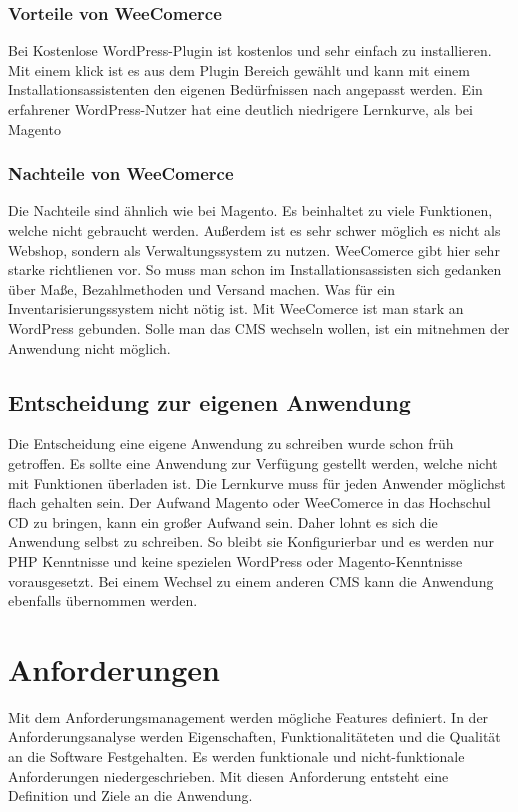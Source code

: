 \subsubsection{Vorteile von WeeComerce}
Bei Kostenlose WordPress-Plugin ist kostenlos und sehr einfach zu installieren. Mit einem klick ist es aus dem Plugin Bereich gewählt und kann mit einem Installationsassistenten den eigenen Bedürfnissen nach angepasst werden. Ein erfahrener WordPress-Nutzer hat eine deutlich niedrigere Lernkurve, als bei Magento \autocite{WeeComerce.2018}

\subsubsection{Nachteile von WeeComerce}
Die Nachteile sind ähnlich wie bei Magento. Es beinhaltet zu viele Funktionen, welche nicht gebraucht werden. Außerdem ist es sehr schwer möglich es nicht als Webshop, sondern als Verwaltungssystem zu nutzen. WeeComerce gibt hier sehr starke richtlienen vor. So muss man schon im Installationsassisten sich gedanken über Maße, Bezahlmethoden und Versand machen. Was für ein Inventarisierungssystem nicht nötig ist. Mit WeeComerce ist man stark an WordPress gebunden. Solle man das \ac{CMS} wechseln wollen, ist ein mitnehmen der Anwendung nicht möglich.

\subsection{Entscheidung zur eigenen Anwendung}
Die Entscheidung eine eigene Anwendung zu schreiben wurde schon früh getroffen. Es sollte eine Anwendung zur Verfügung gestellt werden, welche nicht mit Funktionen überladen ist. Die Lernkurve muss für jeden Anwender möglichst flach gehalten sein. Der Aufwand Magento oder WeeComerce in das Hochschul \ac{CD} zu bringen, kann ein großer Aufwand sein. Daher lohnt es sich die Anwendung selbst zu schreiben. So bleibt sie Konfigurierbar und es werden nur \ac{PHP} Kenntnisse und keine spezielen WordPress oder Magento-Kenntnisse vorausgesetzt. Bei einem Wechsel zu einem anderen \ac{CMS} kann die Anwendung ebenfalls übernommen werden.

\section{Anforderungen}

Mit dem Anforderungsmanagement werden mögliche Features definiert. In der Anforderungsanalyse werden Eigenschaften, Funktionalitäteten und die Qualität an die Software Festgehalten. \autocite{Grande.2014} Es werden funktionale und nicht-funktionale Anforderungen niedergeschrieben. Mit diesen Anforderung entsteht eine Definition und Ziele an die Anwendung.

